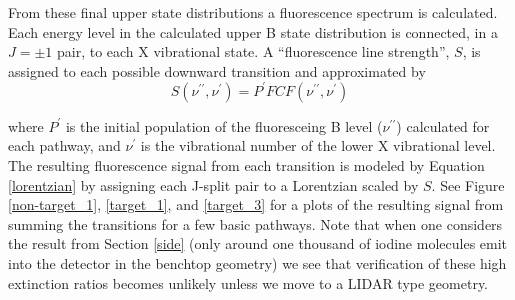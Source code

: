 
From these final upper state distributions a fluorescence spectrum is calculated. Each energy level in the calculated upper B state distribution is connected, in a $J=\pm1$ pair, to each X vibrational state. A ``fluorescence line strength'', $S$, is assigned to each possible downward transition and approximated by
\begin{equation}
S(\nu^{\prime\prime},\nu^{\prime})
=
P^{\prime}FCF(\nu^{\prime\prime},\nu^{\prime})
\end{equation}

where $P^{\prime}$ is the initial population of the fluoresceing B level ($\nu^{\prime\prime}$) calculated for each pathway, and $\nu^{\prime}$ is the vibrational number of the lower X vibrational level. The resulting fluorescence signal from each transition is modeled by Equation \ref{lorentzian} by assigning each J-split pair to a Lorentzian scaled by $S$. See Figure \ref{non-target_1}, \ref{target_1}, and \ref{target_3} for a plots of the resulting signal from summing the transitions for a few basic pathways. Note that when one considers the result from Section \ref{side} (only around one thousand of iodine molecules emit into the detector in the benchtop geometry) we see that verification of these high extinction ratios becomes unlikely unless we move to a LIDAR type geometry.

